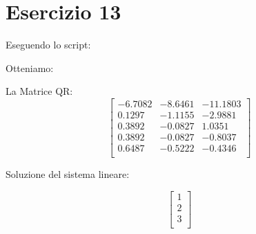 \section{Esercizio 13}
Eseguendo lo script:



Otteniamo: 

La Matrice QR:
\[\begin{bmatrix}
-6.7082 & -8.6461  & -11.1803\\
0.1297 & -1.1155 & -2.9881\\
0.3892 & -0.0827 & 1.0351\\
 0.3892 & -0.0827  & -0.8037\\
0.6487 & -0.5222  & -0.4346\\

\end{bmatrix}\]

Soluzione del sistema lineare: 

\[\begin{bmatrix}
1\\ 2\\3\\

\end{bmatrix}\]